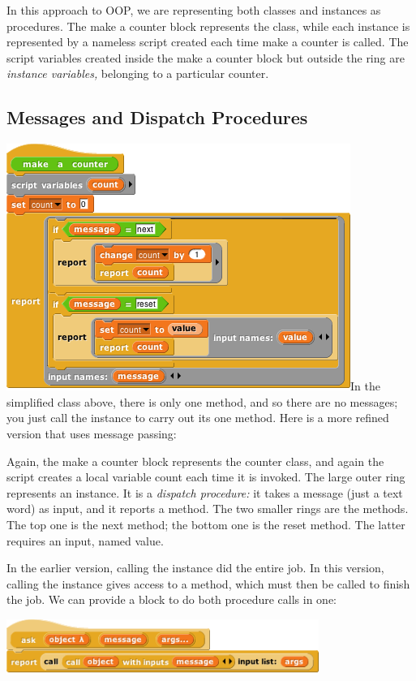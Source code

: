 In this approach to OOP, we are representing both classes and instances
as procedures. The make a counter block represents the class, while each
instance is represented by a nameless script created each time make a
counter is called. The script variables created inside the make a
counter block but outside the ring are \emph{instance variables,}
belonging to a particular counter.

\subsection{Messages and Dispatch
Procedures}\label{messages-and-dispatch-procedures}

\includegraphics[width=4.41667in,height=3.16667in]{media/image853.png}In
the simplified class above, there is only one method, and so there are
no messages; you just call the instance to carry out its one method.
Here is a more refined version that uses message passing:

Again, the make a counter block represents the counter class, and again
the script creates a local variable count each time it is invoked. The
large outer ring represents an instance. It is a \emph{dispatch
procedure:} it takes a message (just a text word) as input, and it
reports a method. The two smaller rings are the methods. The top one is
the next method; the bottom one is the reset method. The latter requires
an input, named value.

In the earlier version, calling the instance did the entire job. In this
version, calling the instance gives access to a method, which must then
be called to finish the job. We can provide a block to do both procedure
calls in one:

\includegraphics[width=4.01042in,height=0.70772in]{media/image854.png}

